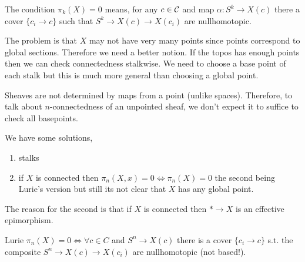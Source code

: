 \documentclass[12pt]{article}
\begin{document}
\begin{rmk}
The condition $\pi_k(X) = 0$ means, for any $c \in \mathcal{C}$ and map $\alpha : S^k \to X(c)$ there a cover $\{ c_i \to c \}$ such that $S^k \to X(c) \to X(c_i)$ are nullhomotopic. 
\end{rmk}

\begin{rmk}
The problem is that $X$ may not have very many points since points correspond to global sections. Therefore we need a better notion. If the topos has enough points then we can check connectedness stalkwise. We need to choose a base point of each stalk but this is much more general than choosing a global point.
\end{rmk}

\begin{rmk}
Sheaves are not determined by maps from a point (unlike spaces). Therefore, to talk about $n$-connectedness of an unpointed sheaf, we don't expect it to suffice to check all basepoints. 
\end{rmk}

We have some solutions,
\begin{enumerate}
\item stalks
\item if $X$ is connected then $\pi_n(X, x) = 0 \iff \pi_n(X) = 0$ the second being Lurie's version but still its not clear that $X$ has any global point.
\end{enumerate}

\begin{rmk}
The reason for the second is that if $X$ is connected then $* \to X$ is an effective epimorphism. 
\end{rmk}

\begin{rmk}
Lurie $\pi_n(X) = 0 \iff \forall c \in C$ and $S^n \to X(c)$ there is a cover $\{ c_i \to c \}$ s.t. the composite $S^n \to X(c) \to X(c_i)$ are nullhomotopic (not based!). 
\end{rmk}
\end{document}
